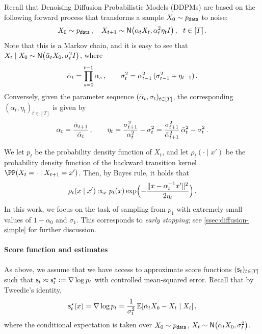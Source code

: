 


Recall that Denoising Diffusion Probabilistic Models (DDPMs) are based on the following forward process that transforms a sample $X_0\sim \pdata$ to noise:
\begin{align}
    X_0\sim \pdata\,, \quad 
    X_{t+1}\sim \normal{\alp_t X_t, \alp_t^2 \eta_t\Id}\,,~~t\in[T]\,.
\end{align}
Note that this is a Markov chain, and it is easy to see that $X_t\mid X_0\sim \normal{\alpbar_t X_0, \sigma_t^2\Id}$, where 
\begin{align}\notag
    \alpbar_t=\prod_{s=0}^{t-1} \alp_s\,, \qquad \sigma_t^2=\alp_{t-1}^2\,(\sigma_{t-1}^2+\eta_{t-1})\,.
\end{align}
Conversely, given the parameter sequence $(\alpbar_t, \sigma_t)_{t\in[T]}$, the corresponding $(\alpha_t, \eta_t)_{t\in[T]}$ is given by
\begin{align}\notag
    \alpha_t=\frac{\alpbar_{t+1}}{\alpbar_t}\,, \qquad
    \eta_t=\frac{\sigma_{t+1}^2}{\alpha_t^2}-\sigma_t^2
    =\frac{\sigma_{t+1}^2}{\alpbar_{t+1}^2}\,\alpbar_t^2-\sigma_t^2\,.
\end{align}

We let $p_t$ be the probability density function of $X_t$, and let $\rho_t(\cdot\mid x')$ be the probability density function of the backward transition kernel $\PP(X_t=\cdot\mid X_{t+1}=x')$. Then, by Bayes rule, it holds that
\begin{align}\label{eq:backward_kernel}
    \rho_t(x\mid x')\propto_x p_t(x) \exp\prn[\Big]{-\frac{\nrm{x-\alp_t^{-1}x'}^2}{2\eta_t}}\,.
\end{align} 
In this work, we focus on the task of sampling from $p_1$ with extremely small values of $1-\alpha_0$ and $\sigma_1$. 
This corresponds to \emph{early stopping}; see \cref{ssec:diffusion-simple} for further discussion. %




\paragraph{Score function and estimates}
As above, we assume that we have access to approximate score functions $(\scf_t)_{t\in[T]}$ such that $\scf_t\approx \scfs_t\ldef \nabla \log p_t$ with controlled mean-squared error. Recall that by Tweedie's identity,
\begin{align}
    \scfs_t(x)=\nabla \log p_t=\frac{1}{\sigma_t^2}\En[\alpbar_t X_0-X_t\mid X_t]\,,
\end{align}
where the conditional expectation is taken over $X_0\sim \pdata$, $X_t\sim \normal{\alpbar_t X_0, \sigma_t^2}$.



